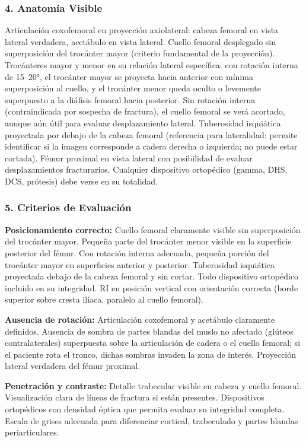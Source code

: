 	\subsubsection*{4. Anatomía Visible}
	
	Articulación coxofemoral en proyección axiolateral: cabeza femoral en vista lateral verdadera, acetábulo en vista lateral. Cuello femoral desplegado sin superposición del trocánter mayor (criterio fundamental de la proyección). Trocánteres mayor y menor en su relación lateral específica: con rotación interna de 15--20°, el trocánter mayor se proyecta hacia anterior con mínima superposición al cuello, y el trocánter menor queda oculto o levemente superpuesto a la diáfisis femoral hacia posterior. Sin rotación interna (contraindicada por sospecha de fractura), el cuello femoral se verá acortado, aunque aún útil para evaluar desplazamiento lateral. Tuberosidad isquiática proyectada por debajo de la cabeza femoral (referencia para lateralidad: permite identificar si la imagen corresponde a cadera derecha o izquierda; no puede estar cortada). Fémur proximal en vista lateral con posibilidad de evaluar desplazamientos fracturarios. Cualquier dispositivo ortopédico (gamma, DHS, DCS, prótesis) debe verse en su totalidad.
	
	\subsubsection*{5. Criterios de Evaluación}
	
	\textbf{Posicionamiento correcto:} Cuello femoral claramente visible sin superposición del trocánter mayor. Pequeña parte del trocánter menor visible en la superficie posterior del fémur. Con rotación interna adecuada, pequeña porción del trocánter mayor en superficies anterior y posterior. Tuberosidad isquiática proyectada debajo de la cabeza femoral y sin cortar. Todo dispositivo ortopédico incluido en su integridad. RI en posición vertical con orientación correcta (borde superior sobre cresta ilíaca, paralelo al cuello femoral).
	
	\textbf{Ausencia de rotación:} Articulación coxofemoral y acetábulo claramente definidos. Ausencia de sombra de partes blandas del muslo no afectado (glúteos contralaterales) superpuesta sobre la articulación de cadera o el cuello femoral; si el paciente rota el tronco, dichas sombras invaden la zona de interés. Proyección lateral verdadera del fémur proximal.
	
	\textbf{Penetración y contraste:} Detalle trabecular visible en cabeza y cuello femoral. Visualización clara de líneas de fractura si están presentes. Dispositivos ortopédicos con densidad óptica que permita evaluar su integridad completa. Escala de grises adecuada para diferenciar cortical, trabeculado y partes blandas periarticulares.
	
